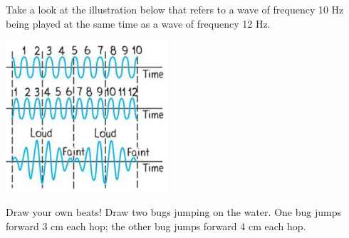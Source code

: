 \documentclass[10pt]{exam}
\begin{document}
    Take a look at the illustration below that refers to a wave of frequency 10 Hz being played at the same time as a wave of frequency 12 Hz.
  
  \centering\includegraphics[width=6cm]{Figure.png}
  
  
    Draw your own beats!  Draw two bugs jumping on the water.  One bug jumps forward 3 cm each hop; the other bug jumps forward 4 cm each hop.
  
\end{document}

